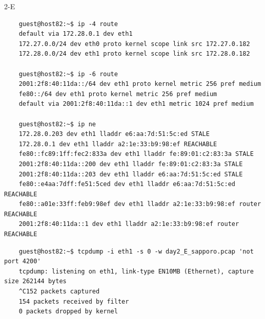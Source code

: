 \begin{maintask}{2-E}
  \begin{termout}[H]
    \caption{実行前の経路表と近隣キャッシュ}\label{out:route_e}
    \begin{verbatim}
    guest@host82:~$ ip -4 route
    default via 172.28.0.1 dev eth1                                                                          
    172.27.0.0/24 dev eth0 proto kernel scope link src 172.27.0.182                                          
    172.28.0.0/24 dev eth1 proto kernel scope link src 172.28.0.182                                          

    guest@host82:~$ ip -6 route                                                                              
    2001:2f8:40:11da::/64 dev eth1 proto kernel metric 256 pref medium                                       
    fe80::/64 dev eth1 proto kernel metric 256 pref medium                                                   
    default via 2001:2f8:40:11da::1 dev eth1 metric 1024 pref medium                                         

    guest@host82:~$ ip ne                                                                                    
    172.28.0.203 dev eth1 lladdr e6:aa:7d:51:5c:ed STALE                                                     
    172.28.0.1 dev eth1 lladdr a2:1e:33:b9:98:ef REACHABLE                                                   
    fe80::fc89:1ff:fec2:833a dev eth1 lladdr fe:89:01:c2:83:3a STALE                                         
    2001:2f8:40:11da::200 dev eth1 lladdr fe:89:01:c2:83:3a STALE                                            
    2001:2f8:40:11da::203 dev eth1 lladdr e6:aa:7d:51:5c:ed STALE                                            
    fe80::e4aa:7dff:fe51:5ced dev eth1 lladdr e6:aa:7d:51:5c:ed REACHABLE                                    
    fe80::a01e:33ff:feb9:98ef dev eth1 lladdr a2:1e:33:b9:98:ef router REACHABLE                             
    2001:2f8:40:11da::1 dev eth1 lladdr a2:1e:33:b9:98:ef router REACHABLE        
    \end{verbatim}
  \end{termout}

  \begin{termout}[H]
    \caption{www.city.sapporo.jp の tcpdump と wget の実行結果}\label{out:e_sapporo}
    \begin{verbatim}
    guest@host82:~$ tcpdump -i eth1 -s 0 -w day2_E_sapporo.pcap 'not port 4200'
    tcpdump: listening on eth1, link-type EN10MB (Ethernet), capture size 262144 bytes
    ^C152 packets captured
    154 packets received by filter
    0 packets dropped by kernel


\end{verbatim}
\end{termout}
\end{maintask}

